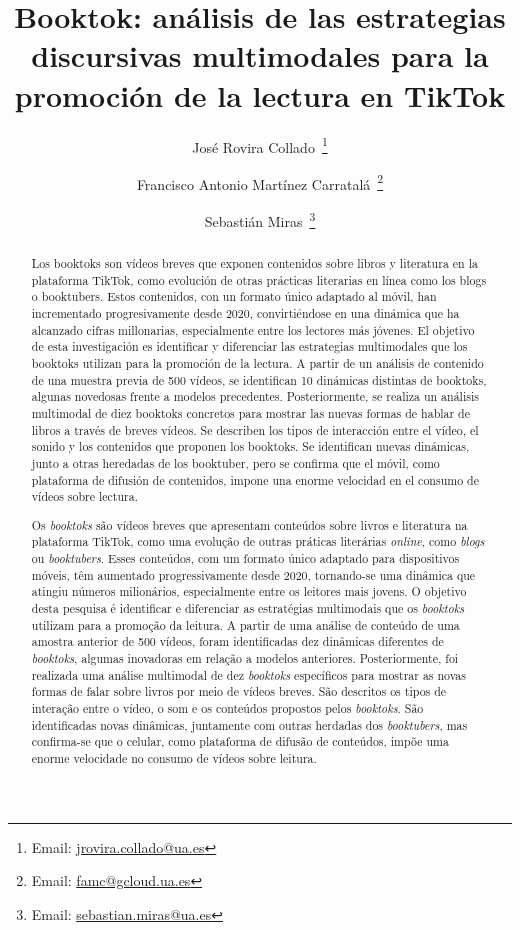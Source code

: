 \documentclass[spanish]{textolivre}
\title{Booktok: análisis de las estrategias discursivas multimodales para la promoción de la lectura en TikTok}
\author[1]{José Rovira Collado~\orcid{0000-0002-3491-8747}\thanks{Email: \href{mailto:jrovira.collado@ua.es}{jrovira.collado@ua.es}}}
\author[1]{Francisco Antonio Martínez Carratalá~\orcid{0000-0002-0587-5063}\thanks{Email: \href{mailto:famc@gcloud.ua.es}{famc@gcloud.ua.es}}}
\author[1]{Sebastián Miras~\orcid{0000-0002-4259-3890}\thanks{Email: \href{mailto:sebastian.miras@ua.es}{sebastian.miras@ua.es}}}
\affil[1]{Universidad de Alicante, Facultad de Educación, Alicante, España.}
\begin{document}
\maketitle
\begin{polyabstract}
\begin{abstract}
Los booktoks son vídeos breves que exponen contenidos sobre libros y literatura en la plataforma TikTok, como evolución de otras prácticas literarias en línea como los blogs o booktubers. Estos contenidos, con un formato único adaptado al móvil, han incrementado progresivamente desde 2020, convirtiéndose en una dinámica que ha alcanzado cifras millonarias, especialmente entre los lectores más jóvenes. El objetivo de esta investigación es identificar y diferenciar las estrategias multimodales que los booktoks utilizan para la promoción de la lectura. A partir de un análisis de contenido de una muestra previa de 500 vídeos, se identifican 10 dinámicas distintas de booktoks, algunas novedosas frente a modelos precedentes. Posteriormente, se realiza un análisis multimodal de diez booktoks concretos para mostrar las nuevas formas de hablar de libros a través de breves vídeos. Se describen los tipos de interacción entre el vídeo, el sonido y los contenidos que proponen los booktoks. Se identifican nuevas dinámicas, junto a otras heredadas de los booktuber, pero se confirma que el móvil, como plataforma de difusión de contenidos, impone una enorme velocidad en el consumo de vídeos sobre lectura.

\end{abstract}

\begin{abstract}
Os \textit{booktoks} são vídeos breves que apresentam conteúdos sobre livros e literatura na plataforma TikTok, como uma evolução de outras práticas literárias \textit{online}, como \textit{blogs} ou \textit{booktubers}. Esses conteúdos, com um formato único adaptado para dispositivos móveis, têm aumentado progressivamente desde 2020, tornando-se uma dinâmica que atingiu números milionários, especialmente entre os leitores mais jovens. O objetivo desta pesquisa é identificar e diferenciar as estratégias multimodais que os \textit{booktoks} utilizam para a promoção da leitura. A partir de uma análise de conteúdo de uma amostra anterior de 500 vídeos, foram identificadas dez dinâmicas diferentes de \textit{booktoks}, algumas inovadoras em relação a modelos anteriores. Posteriormente, foi realizada uma análise multimodal de dez \textit{booktoks} específicos para mostrar as novas formas de falar sobre livros por meio de vídeos breves. São descritos os tipos de interação entre o vídeo, o som e os conteúdos propostos pelos \textit{booktoks}. São identificadas novas dinâmicas, juntamente com outras herdadas dos \textit{booktubers}, mas confirma-se que o celular, como plataforma de difusão de conteúdos, impõe uma enorme velocidade no consumo de vídeos sobre leitura.


\end{abstract}
\end{polyabstract}
\end{document}
